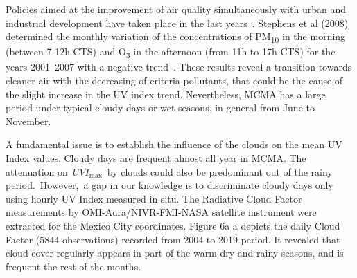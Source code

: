 \documentclass{article}
\begin{document}
{Policies aimed at the improvement of air quality simultaneously with
urban and industrial development have taken place in the last
years~\cite{figueroa2009}. Stephens et al (2008) determined the monthly
variation of the concentrations of PM\textsubscript{10} in the morning
(between 7-12h CTS) and O\textsubscript{3} in the afternoon (from 11h to
17h CTS) for the years 2001--2007 with a negative
trend~\cite{Stephens_2008}. These results reveal a transition towards
cleaner air with the decreasing of criteria pollutants, that could be
the cause of the slight increase in the UV index trend. Nevertheless,
MCMA has a large period under typical cloudy days or wet seasons, in
general from June to November.

A fundamental issue is to establish the influence of the clouds on the
mean UV Index values. C{loudy days are frequent almost all year in MCMA.
The attenuation on~\(UVI_{\max}\)~by clouds could also be
predominant out of the rainy period.~However,~a gap in our knowledge is
to discriminate cloudy days only using hourly UV Index measured in situ.
T}he Radiative Cloud Factor measurements by OMI-Aura/NIVR-FMI-NASA
satellite instrument were extracted for the Mexico City coordinates.
Figure 6a %
a depicts the daily Cloud Factor
(5844 observations) recorded from 2004 to 2019 period. It revealed that
cloud cover regularly appears in part of the warm dry and rainy seasons,
and is frequent the rest of the months.~

}
\end{document}
